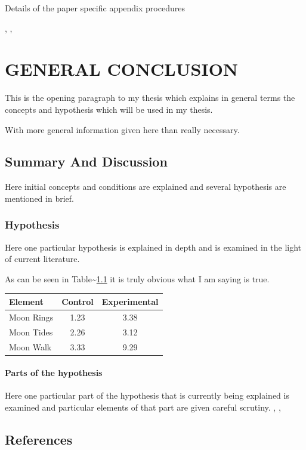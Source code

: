 \documentclass[
  12pt,
  notitlepage]{isuthesis}
\begin{document}
Details of the paper specific appendix procedures

\cite{Rad87}
\cite{MOR91}, \cite{Lom73}
\cite{Lom91}, \cite{Lom92}
\cite{dB59}

\endrefsection

\chapter{GENERAL CONCLUSION}
\label{future-work}

This is the opening paragraph to my thesis which
explains in general terms the concepts and hypothesis
which will be used in my thesis.

With more general information given here than really
necessary.

\section{Summary And Discussion}

Here initial concepts and conditions are explained and
several hypothesis are mentioned in brief.

\subsection{Hypothesis}

Here one particular hypothesis is explained in depth
and is examined in the light of current literature.

As can be seen in Table\textasciitilde{}\ref{nothingelse} it is
truly obvious what I am saying is true.

\begin{table} \centering
{}
\label{nothingelse}
\begin{tabular}{lcc} \hline
\textbf{Element} & \textbf{Control} & \textbf{Experimental} \\ \hline
Moon Rings & 1.23 & 3.38 \\
Moon Tides & 2.26 & 3.12 \\
Moon Walk & 3.33 & 9.29 \\ \hline
\end{tabular}
\end{table}

\subsubsection{Parts of the hypothesis}

Here one particular part of the hypothesis that is
currently being explained is examined and particular
elements of that part are given careful scrutiny. \cite{allen}, \cite{bruner}, \cite{struss}

\section{References}
\printbibliography[heading=none, section=6]
\endrefsection

\printbibliography

\clearpage
\pagebreak
\end{document}
